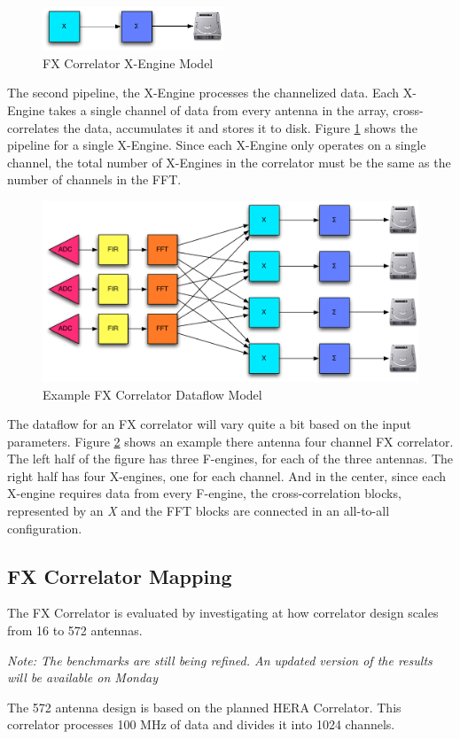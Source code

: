 \begin{figure}[h!]
  \centering
    \includegraphics[width=0.48\textwidth]{Images/C4/fx_x_engine.pdf}
  \caption{FX Correlator X-Engine Model}
  \label{fig: C4/fx_x_engine.pdf}
\end{figure}

The second pipeline, the X-Engine processes the channelized data. 
Each X-Engine takes a single channel of data from every antenna in the array, cross-correlates the data, accumulates it and stores it to disk. 
Figure \ref{fig: C4/fx_x_engine.pdf} shows the pipeline for a single X-Engine. 
Since each X-Engine only operates on a single channel, the total number of X-Engines in the correlator must be the same as the number of channels in the FFT.

\begin{figure}[h!]
  \centering
    \includegraphics[width=1\textwidth]{Images/C4/fx_dataflow.pdf}
  \caption{Example FX Correlator Dataflow Model}
  \label{fig: C4/fx_dataflow.pdf}
\end{figure}

The dataflow for an FX correlator will vary quite a bit based on the input parameters. 
Figure \ref{fig: C4/fx_dataflow.pdf} shows an example there antenna four channel FX correlator. 
The left half of the figure has three F-engines, for each of the three antennas.
The right half has four X-engines, one for each channel.
And in the center, since each X-engine requires data from every F-engine, the cross-correlation blocks, represented by an \emph{X} and the FFT blocks are connected in an all-to-all configuration.

\subsection{FX Correlator Mapping}
The FX Correlator is evaluated by investigating at how correlator design scales from 16 to 572 antennas.

\emph{Note: The benchmarks are still being refined. An updated version of the results will be available on Monday}

The 572 antenna design is based on the planned HERA Correlator.
This correlator processes 100 MHz of data and divides it into 1024 channels.


